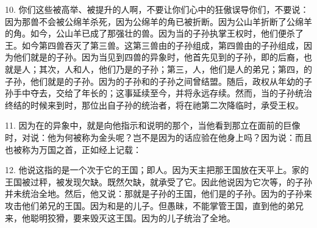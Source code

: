 10. 你们这些被高举、被提升的人啊，不要让你们心中的狂傲误导你们，不要说：因为那兽不会被公绵羊杀死，因为公绵羊的角已被折断。因为公山羊折断了公绵羊的角。如今，公山羊已成了那强壮的兽。因为当的子孙执掌王权时，他们便杀了王。如今第四兽吞灭了第三兽。这第三兽由的子孙组成，第四兽由的子孙组成，因为他们就是的子孙。因为当见到四兽的异象时，他首先见到的子孙，即的后裔，也就是人；其次，人和人，他们乃是的子孙；第三，人，他们是人的弟兄；第四，的子孙，他们就是的子孙。因为的子孙和的子孙之间曾结盟。随后，政权从年幼的子孙手中夺去，交给了年长的；这事延续至今，并将永远存续。然而，当的子孙统治终结的时候来到时，那位出自子孙的统治者，将在祂第二次降临时，承受王权。\par

11. 因为在的异象中，就是向他指示和说明的那个，当他看到那立在面前的巨像时，对说：他为何被称为金头呢？岂不是因为的话应验在他身上吗？因为说：而且也被称为万国之首，正如经上记载：\par

12. 他说这指的是一个次于它的王国；即人。因为天主把那王国放在天平上。家的王国被过秤，被发现欠缺。既然欠缺，就承受了它。因此他说因为它次等，的子孙并未统治全地。然后，他又说：那就是子孙的王国，他们是的子孙。因为的子孙来攻击他们弟兄的王国。因为和是的儿子。但愚昧，不能掌管王国，直到他的弟兄来，他聪明狡猾，要来毁灭这王国。因为的儿子统治了全地。\par

